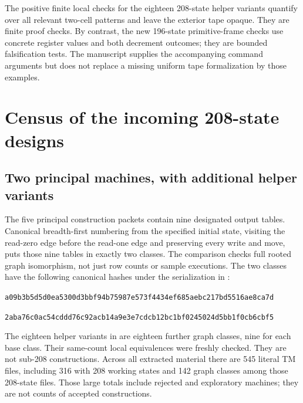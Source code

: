 \documentclass[11pt,a4paper]{article}
\begin{document}
The positive finite local checks for the eighteen 208-state helper
variants quantify over all relevant two-cell patterns and leave the
exterior tape opaque. They are finite proof checks. By contrast, the
new 196-state primitive-frame checks use concrete register values and
both decrement outcomes; they are bounded falsification tests. The
manuscript supplies the accompanying command arguments but does not
replace a missing uniform tape formalization by those examples.

\section{Census of the incoming 208-state designs}

\subsection{Two principal machines, with additional helper variants}

The five principal construction packets contain nine designated output
tables. Canonical breadth-first numbering from the specified initial
state, visiting the read-zero edge before the read-one edge and preserving
every write and move, puts those nine tables in exactly two classes.
The comparison checks full rooted graph isomorphism, not just row counts
or sample executions. The two classes have the following canonical hashes
under the serialization in :
\begin{description}[style=nextline]
\item[Class A.]
\nolinkurl{a09b3b5d5d0ea5300d3bbf94b75987e573f4434ef685aebc217bd5516ae8ca7d}
\item[Class B.]
\nolinkurl{2aba76c0ac54cddd76c92acb14a9e3e7cdcb12bc1bf0245024d5bb1f0cb6cbf5}
\end{description}
The eighteen helper variants in 
are eighteen further graph classes, nine for each base class. Their
same-count local equivalences were freshly checked. They are not
sub-208 constructions. Across all extracted material there are 545
literal TM files, including 316 with 208 working states and 142 graph
classes among those 208-state files. Those large totals include rejected
and exploratory machines; they are not counts of accepted constructions.
\end{document}
